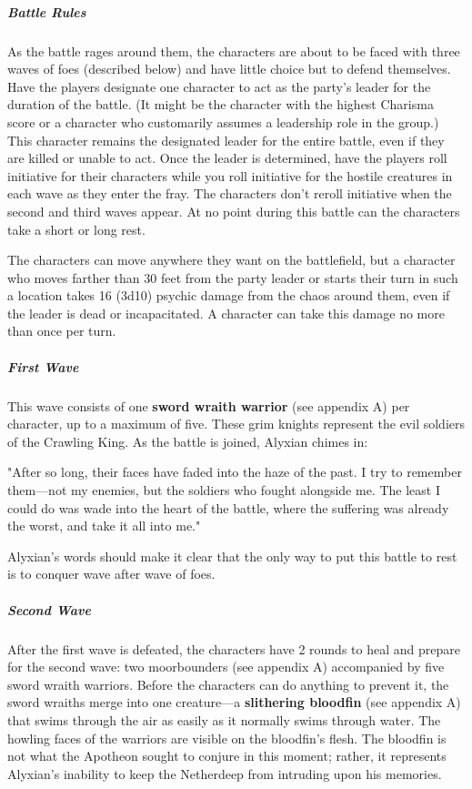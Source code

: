 \documentclass[10pt,a4paper,twoside,fancy,bg=print,twocolumn,openany,nodeprecatedcode]{dndbook}
\begin{document}
\subparagraph{Battle Rules}
As the battle rages around them, the characters are about to be faced with three waves of foes (described below) and have little choice but to defend themselves. Have the players designate one character to act as the party's leader for the duration of the battle. (It might be the character with the highest Charisma score or a character who customarily assumes a leadership role in the group.) This character remains the designated leader for the entire battle, even if they are killed or unable to act. Once the leader is determined, have the players roll initiative for their characters while you roll initiative for the hostile creatures in each wave as they enter the fray. The characters don't reroll initiative when the second and third waves appear. At no point during this battle can the characters take a short or long rest.

The characters can move anywhere they want on the battlefield, but a character who moves farther than 30 feet from the party leader or starts their turn in such a location takes 16 (3d10) psychic damage from the chaos around them, even if the leader is dead or incapacitated. A character can take this damage no more than once per turn.

\subparagraph{First Wave}
This wave consists of one \textbf{sword wraith warrior} (see appendix A) per character, up to a maximum of five. These grim knights represent the evil soldiers of the Crawling King. As the battle is joined, Alyxian chimes in:

\begin{DndReadAloud}{}
"After so long, their faces have faded into the haze of the past. I try to remember them—not my enemies, but the soldiers who fought alongside me. The least I could do was wade into the heart of the battle, where the suffering was already the worst, and take it all into me."

\end{DndReadAloud}

Alyxian's words should make it clear that the only way to put this battle to rest is to conquer wave after wave of foes.

\subparagraph{Second Wave}
After the first wave is defeated, the characters have 2 rounds to heal and prepare for the second wave: two moorbounders (see appendix A) accompanied by five sword wraith warriors. Before the characters can do anything to prevent it, the sword wraiths merge into one creature—a \textbf{slithering bloodfin} (see appendix A) that swims through the air as easily as it normally swims through water. The howling faces of the warriors are visible on the bloodfin's flesh. The bloodfin is not what the Apotheon sought to conjure in this moment; rather, it represents Alyxian's inability to keep the Netherdeep from intruding upon his memories.
\end{document}
